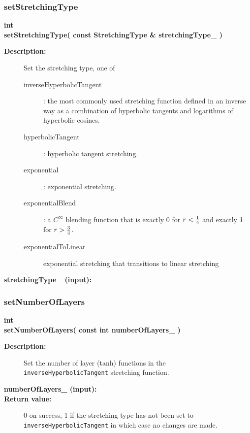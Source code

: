 \subsubsection{setStretchingType}
 
\begin{flushleft} \textbf{%
int   \\ 
\settowidth{\StretchMappingIncludeArgIndent}{setStretchingType(}%
setStretchingType(  const StretchingType \& stretchingType\_ )
}\end{flushleft}
\begin{description}
\item[{\bf Description:}]  Set the stretching type, one of
  \begin{description}
   \item[inverseHyperbolicTangent] : the most commonly used stretching function
      defined in an inverse way as a combination of hyperbolic tangents and
      logarithms of hyperbolic cosines.
   \item[hyperbolicTangent] : hyperbolic tangent stretching.
   \item[exponential] : exponential stretching.
   \item[exponentialBlend] : a $C^\infty$ blending function that is exactly 0 for $r<{1\over4}$
        and exactly 1 for $r>{3\over4}$.
   \item[exponentialToLinear] exponential stretching that transitions to linear stretching
  \end{description}
\item[{\bf stretchingType\_ (input):}] 
\end{description}
\subsubsection{setNumberOfLayers}
 
\begin{flushleft} \textbf{%
int  \\ 
\settowidth{\StretchMappingIncludeArgIndent}{setNumberOfLayers(}%
setNumberOfLayers( const int numberOfLayers\_ ) 
}\end{flushleft}
\begin{description}
\item[{\bf Description:}]  
    Set the number of layer (tanh) functions in the {\tt inverseHyperbolicTangent} stretching
   function.
\item[{\bf numberOfLayers\_ (input):}] 
\item[{\bf Return value:}]  0 on success, 1 if the stretching type has not been set to {\tt inverseHyperbolicTangent}
   in which case no changes are made.  
\end{description}

